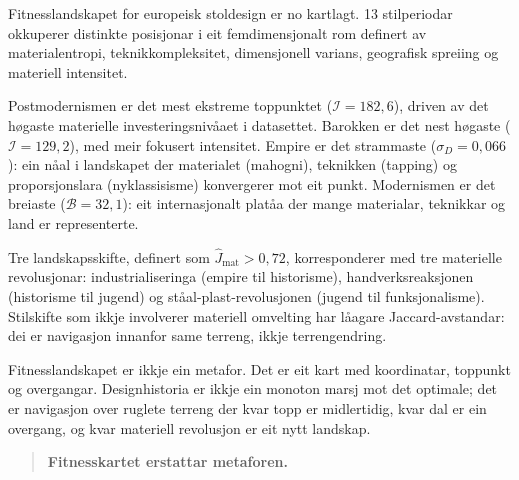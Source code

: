 \documentclass[10pt, a4paper, twocolumn]{article}
\begin{document}
Fitnesslandskapet for europeisk stoldesign er no kartlagt. 13 stilperiodar okkuperer distinkte posisjonar i eit femdimensjonalt rom definert av materialentropi, teknikkompleksitet, dimensjonell varians, geografisk spreiing og materiell intensitet.

Postmodernismen er det mest ekstreme toppunktet ($\mathcal{I} = 182{,}6$), driven av det h\o gaste materielle investeringsniv\r{a}aet i datasettet. Barokken er det nest h\o gaste ($\mathcal{I} = 129{,}2$), med meir fokusert intensitet. Empire er det strammaste ($\sigma_D = 0{,}066$): ein n\r{a}al i landskapet der materialet (mahogni), teknikken (tapping) og proporsjonslara (nyklassisisme) konvergerer mot eit punkt. Modernismen er det breiaste ($\mathcal{B} = 32{,}1$): eit internasjonalt plat\r{a}a der mange materialar, teknikkar og land er representerte.

Tre landskapsskifte, definert som $\hat{J}_{\text{mat}} > 0{,}72$, korresponderer med tre materielle revolusjonar: industrialiseringa (empire til historisme), handverksreaksjonen (historisme til jugend) og st\r{a}al-plast-revolusjonen (jugend til funksjonalisme). Stilskifte som ikkje involverer materiell omvelting har l\r{a}agare Jaccard-avstandar: dei er navigasjon innanfor same terreng, ikkje terrengendring.

Fitnesslandskapet er ikkje ein metafor. Det er eit kart med koordinatar, toppunkt og overgangar. Designhistoria er ikkje ein monoton marsj mot det optimale; det er navigasjon over ruglete terreng der kvar topp er midlertidig, kvar dal er ein overgang, og kvar materiell revolusjon er eit nytt landskap.

\begin{quote}
\textbf{Fitnesskartet erstattar metaforen.}
\end{quote}


\newpage
\onecolumn


\end{document}
